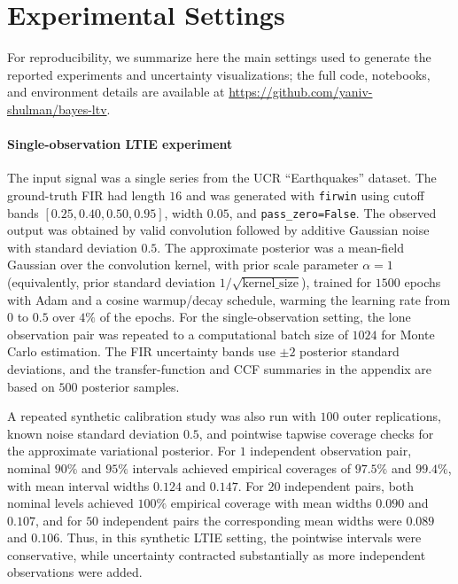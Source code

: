 \documentclass[preprint,1p,times,authoryear]{elsarticle}
\begin{document}
\appendix
\section{Experimental Settings}
\label{app:experimental_settings}

For reproducibility, we summarize here the main settings used to generate the reported experiments and uncertainty visualizations; the full code, notebooks, and environment details are available at \url{https://github.com/yaniv-shulman/bayes-ltv}.

\paragraph{\textbf{Single-observation LTIE experiment}}
The input signal was a single series from the UCR ``Earthquakes'' dataset. The ground-truth FIR had length $16$ and was generated with \texttt{firwin} using cutoff bands $[0.25, 0.40, 0.50, 0.95]$, width $0.05$, and \texttt{pass\_zero=False}. The observed output was obtained by valid convolution followed by additive Gaussian noise with standard deviation $0.5$. The approximate posterior was a mean-field Gaussian over the convolution kernel, with prior scale parameter $\alpha=1$ (equivalently, prior standard deviation $1/\sqrt{\text{kernel\_size}}$), trained for $1500$ epochs with Adam and a cosine warmup/decay schedule, warming the learning rate from $0$ to $0.5$ over $4\%$ of the epochs. For the single-observation setting, the lone observation pair was repeated to a computational batch size of $1024$ for Monte Carlo estimation. The FIR uncertainty bands use $\pm 2$ posterior standard deviations, and the transfer-function and CCF summaries in the appendix are based on $500$ posterior samples.

A repeated synthetic calibration study was also run with $100$ outer replications, known noise standard deviation $0.5$, and pointwise tapwise coverage checks for the approximate variational posterior. For $1$ independent observation pair, nominal $90\%$ and $95\%$ intervals achieved empirical coverages of $97.5\%$ and $99.4\%$, with mean interval widths $0.124$ and $0.147$. For $20$ independent pairs, both nominal levels achieved $100\%$ empirical coverage with mean widths $0.090$ and $0.107$, and for $50$ independent pairs the corresponding mean widths were $0.089$ and $0.106$. Thus, in this synthetic LTIE setting, the pointwise intervals were conservative, while uncertainty contracted substantially as more independent observations were added.
\end{document}
